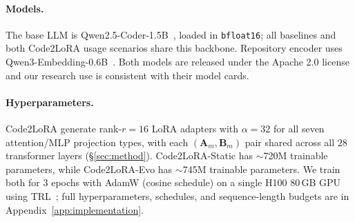 \documentclass{llmxive}
\providecommand{\codelora}{Code2LoRA\xspace}
\providecommand{\codelorastatic}{\codelora-Static\xspace}
\providecommand{\codeloraevo}{\codelora-Evo\xspace}
\begin{document}
\paragraph{Models.}
The base LLM is Qwen2.5-Coder-1.5B~\cite{hui2024qwen25coder}, loaded in \texttt{bfloat16}; all baselines and both \codelora{} usage scenarios share this backbone.
Repository encoder uses Qwen3-Embedding-0.6B~\cite{zhang2025qwen3embedding}. %
Both models are released under the Apache 2.0 license and our research use is consistent with their model cards.

\paragraph{Hyperparameters.}
\codelora{} generate rank-$r{=}16$ LoRA adapters with $\alpha{=}32$ for all seven attention/MLP projection types, with each $(\mathbf{A}_m, \mathbf{B}_m)$ pair shared across all $28$ transformer layers (\S\ref{sec:method}).
\codelorastatic{} has ${\sim}$720M trainable parameters, while \codeloraevo{} has ${\sim}$745M trainable parameters.
We train both for 3 epochs with AdamW (cosine schedule) on a single H100 80\,GB GPU using TRL~\cite{vonwerra2022trl}; full hyperparameters, schedules, and sequence-length budgets are in Appendix~\ref{app:implementation}.
\end{document}
